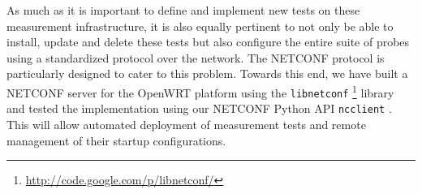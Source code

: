 As much as it is important to define and implement new tests on these
measurement infrastructure, it is also equally pertinent to not only be able
to install, update and delete these tests but also configure the entire suite
of probes using a standardized protocol over the network. The \ac{NETCONF}
protocol \cite{rfc6241} is particularly designed to cater to this problem.
Towards this end, we have built a \ac{NETCONF} server for the OpenWRT platform
using the \texttt{libnetconf}
\footnote{\url{http://code.google.com/p/libnetconf/}} library and tested the
implementation using our NETCONF Python API \texttt{ncclient}
\cite{sbhushan:2009}. This will allow automated deployment of measurement
tests and remote management of their startup configurations.


